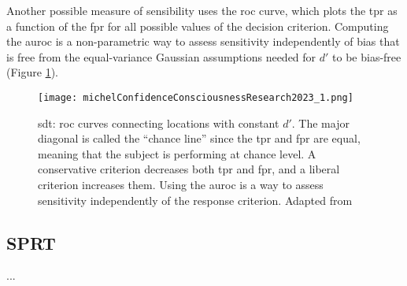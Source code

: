 Another possible measure of sensibility uses the \acrfull{roc} curve, which plots the \acrlong{tpr} as a function of the \acrlong{fpr} for all possible values of the decision criterion. Computing the \acrfull{auroc} is a non-parametric way to assess \gls{sensitivity} independently of bias that is free from the equal-variance Gaussian assumptions needed for $d'$ to be bias-free \cite{flemingHowMeasureMetacognition2014} (Figure \ref{figure:roc_curves}).

\begin{figure}[ht]
    \centering
    \texttt{[image: michelConfidenceConsciousnessResearch2023\_1.png]}
    \caption[\acrlong{sdt}: \acrshort{roc} curves]{\acrlong{sdt}: \acrshort{roc} curves connecting locations with constant $d'$. The major diagonal is called the “chance line” since the \acrlong{tpr} and \acrlong{fpr} are equal, meaning that the subject is performing at chance level. A conservative criterion decreases both \acrshort{tpr} and \acrshort{fpr}, and a liberal criterion increases them. Using the \acrlong{auroc} is a way to assess \gls{sensitivity} independently of the response criterion. Adapted from \cite{michelConfidenceConsciousnessResearch2023}}
    \label{figure:roc_curves}
\end{figure}

\subsection{SPRT}

...